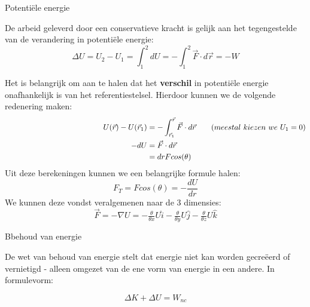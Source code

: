 \begin{theo}{Potentiële energie}
    
    
    \noindent De arbeid geleverd door een conservatieve kracht is gelijk aan het tegengestelde van de verandering in potentiële energie: 
        \begin{equation*}
            \Delta U = U_2 - U_1 = \int_1^2dU = -\int_1^2 \Vec{F}\cdot d\Vec{r} = -W
        \end{equation*}
    
    \noindent Het is belangrijk om aan te halen dat het \textbf{verschil} in potentiële energie onafhankelijk is van het referentiestelsel. Hierdoor kunnen we de volgende redenering maken:
    \begin{align*}
        \hspace{4.5cm} U(\Vec{r}) - U(\Vec{r}_1) &=  -\int_{\Vec{r}_1}^{\Vec{r}} \Vec{F}\cdot d\Vec{r} \quad \quad (meestal \ kiezen \ we \  U_1 = 0) \\
            -dU &= \Vec{F}\cdot d\Vec{r}  \\
                &= drFcos(\theta) 
    \end{align*}
    Uit deze berekeningen kunnen we een belangrijke formule halen:
    \begin{equation*}
        F_T = Fcos(\theta) = -\dfrac{dU}{dr}
    \end{equation*}
    We kunnen deze vondst veralgemenen naar de 3 dimensies:
    \begin{equation*}
        \Vec{F} = -\nabla U = -\tfrac{\theta}{\theta x}U\hat{i} - \tfrac{\theta}{\theta y}U\hat{j} - \tfrac{\theta}{\theta z}U\hat{k}
    \end{equation*}
    
\end{theo}

\begin{lem}{Bbehoud van energie}

    De wet van behoud van energie stelt dat energie niet kan worden gecreëerd of vernietigd - alleen omgezet van de ene vorm van energie in een andere. In formulevorm:
    
    \begin{equation*}
        \Delta K + \Delta U = W_{nc} 
    \end{equation*}
    \vspace{-0.5cm}
\end{lem}

